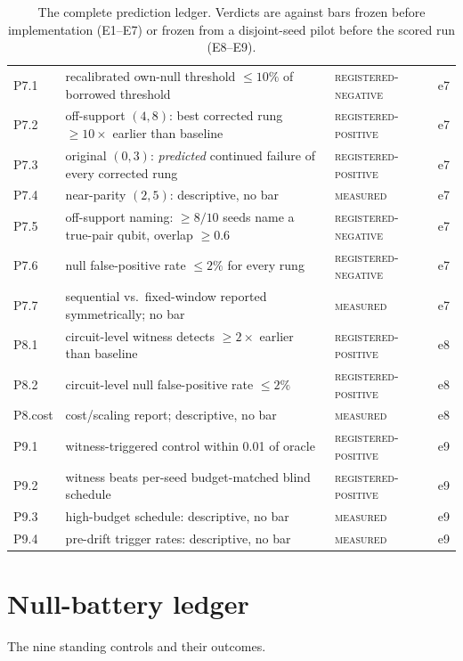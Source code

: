 \documentclass[11pt]{article}
\newcommand{\grade}[1]{\textsc{#1}}
\newcommand{\gMeasured}{\grade{measured}}
\newcommand{\gRegPos}{\grade{registered-positive}}
\newcommand{\gRegNeg}{\grade{registered-negative}}
\theoremstyle{definition}
\begin{document}
\begin{table}[htbp]
\begin{tabular}{l p{9.2cm} l l}
P7.1 & recalibrated own-null threshold $\le 10\%$ of borrowed threshold & \gRegNeg & e7 \\ P7.2 & off-support $(4,8)$: best corrected rung $\ge 10\times$ earlier than baseline & \gRegPos & e7 \\ P7.3 & original $(0,3)$: \emph{predicted} continued failure of every corrected rung & \gRegPos & e7 \\ P7.4 & near-parity $(2,5)$: descriptive, no bar & \gMeasured & e7 \\ P7.5 & off-support naming: $\ge 8/10$ seeds name a true-pair qubit, overlap $\ge 0.6$ & \gRegNeg & e7 \\ P7.6 & null false-positive rate $\le 2\%$ for every rung & \gRegNeg & e7 \\ P7.7 & sequential vs.\ fixed-window reported symmetrically; no bar & \gMeasured & e7 \\ P8.1 & circuit-level witness detects $\ge 2\times$ earlier than baseline & \gRegPos & e8 \\ P8.2 & circuit-level null false-positive rate $\le 2\%$ & \gRegPos & e8 \\ P8.cost & cost/scaling report; descriptive, no bar & \gMeasured & e8 \\ P9.1 & witness-triggered control within 0.01 of oracle & \gRegPos & e9 \\ P9.2 & witness beats per-seed budget-matched blind schedule & \gRegPos & e9 \\ P9.3 & high-budget schedule: descriptive, no bar & \gMeasured & e9 \\ P9.4 & pre-drift trigger rates: descriptive, no bar & \gMeasured & e9 \\ \bottomrule
\end{tabular}
\caption{The complete prediction ledger. Verdicts are against bars frozen before implementation (E1--E7) or frozen from a disjoint-seed pilot before the scored run (E8--E9).}
\label{tab:ledger}
\end{table}

 \section{Null-battery ledger}
\label{app:nulls}

The nine standing controls and their outcomes.
\end{document}
